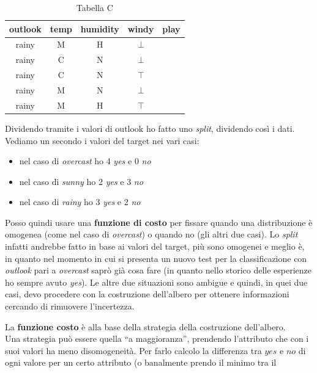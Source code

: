 \documentclass[a4paper,12pt, oneside]{book}
\begin{document}
\begin{esempio}
\begin{table}[H]
  \end{table}
  \begin{table}[H]
    \centering
    \begin{tabular}{c|c|c|c|c}
      outlook & temp & humidity & windy & play\\
      \hline
      rainy & M & H & $\bot$ & \color{darkgreen}{yes}\\
      rainy & C & N & $\bot$ & \color{darkgreen}{yes}\\
      rainy & C & N & $\top$ & \color{red}{no}\\
      rainy & M & N & $\bot$ & \color{darkgreen}{yes}\\
      rainy & M & H & $\top$ & \color{red}{no}
    \end{tabular}
    \caption{Tabella C}
  \end{table}
  Dividendo tramite i valori di outlook ho fatto uno \textit{split}, dividendo
  così i dati.\\
  Vediamo un secondo i valori del target nei vari casi:
  \begin{itemize}
    \item nel caso di \textit{overcast} ho 4 \textit{yes} e 0 \textit{no}
    \item nel caso di \textit{sunny} ho 2 \textit{yes} e 3 \textit{no}
    \item nel caso di \textit{rainy} ho 3 \textit{yes} e 2 \textit{no}
  \end{itemize}
  Posso quindi usare una \textbf{funzione di costo} per fissare quando una
  distribuzione è omogenea (come nel caso di \textit{overcast}) o quando no (gli
  altri due casi). Lo \textit{split} infatti andrebbe fatto in base ai valori
  del target, più sono omogenei e meglio è, in quanto nel momento in cui si
  presenta un nuovo test per la classificazione con \textit{outlook} pari a
  \textit{overcast} saprò già cosa fare (in quanto nello storico delle
  esperienze ho sempre avuto \textit{yes}). Le altre due situazioni sono
  ambigue e quindi, in quei due casi, devo procedere con la costruzione
  dell'albero per ottenere informazioni cercando di rimuovere l'incertezza.  
\end{esempio}
La \textbf{funzione costo} è alla base della strategia della costruzione
dell'albero.\\
Una strategia può essere quella ``a maggioranza'', prendendo l'attributo che con
i suoi valori ha meno disomogeneità. Per farlo calcolo la differenza tra $yes$ e
$no$ di ogni valore per un certo attributo (o banalmente prendo il minimo tra il
\end{document}
